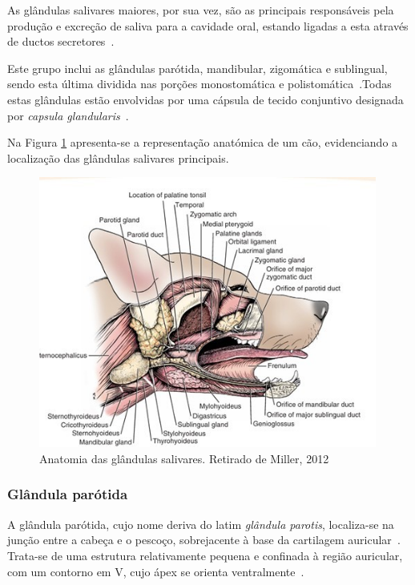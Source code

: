 As glândulas salivares maiores, por sua vez, são as principais responsáveis pela produção e excreção de saliva para a cavidade oral, estando ligadas a esta através de ductos secretores~\cite{Singh2017,liebich_veterinary_2019,konig_veterinary_2020}. 

Este grupo inclui as glândulas parótida, mandibular, zigomática e sublingual, sendo esta última dividida nas porções monostomática e polistomática~\cite{liebich_veterinary_2019}.Todas estas glândulas estão envolvidas por uma cápsula de tecido conjuntivo designada por \textit{capsula glandularis}~\cite{liebich_veterinary_2019}.

Na Figura \ref{fig:f1} apresenta-se a representação anatómica de um cão, evidenciando a localização das glândulas salivares principais.

\begin{figure}[!htb]
  \caption{Anatomia das glândulas salivares. Retirado de Miller, 2012}
  \label{fig:f1}
  \centering
  \includegraphics[width=0.99\textwidth]{../Figures/glls.jpg}
\end{figure}

\subsubsection{Glândula parótida}

A glândula parótida, cujo nome deriva do latim \textit{glândula parotis}, localiza-se na junção entre a cabeça e o pescoço, sobrejacente  à base da cartilagem auricular~\cite{Singh2017}. Trata-se de uma estrutura relativamente pequena e confinada à região auricular, com um contorno em V, cujo ápex se orienta ventralmente~\cite{Singh2017}.

